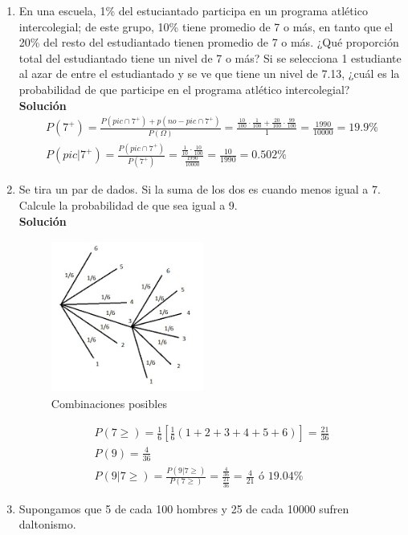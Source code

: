 \begin{enumerate}
    \item En una escuela, 1\% del estuciantado participa en un programa atlético intercolegial; de este grupo, 10\% tiene promedio de 7 o más, en tanto que el 20\% del resto del estudiantado tienen promedio de 7 o más. ¿Qué proporción total del estudiantado tiene un nivel de 7 o más? Si se selecciona 1 estudiante al azar de entre el estudiantado y se ve que tiene un nivel de 7.13, ¿cuál es la probabilidad de que participe en el programa atlético intercolegial?
    \\\textbf{Solución}
    \begin{gather*}
    P(7^+) = \frac{P(pic \cap 7^+) + p(no-pic \cap 7^+)}{P(\Omega)} = \frac{\frac{10}{100} \cdot \frac{1}{100} + \frac{20}{100} \cdot \frac{99}{100}}{1} = \frac{1990}{10000} = 19.9\% \\
    P(pic | 7^+) = \frac{P(pic \cap 7^+)}{P(7^+)} = \frac{\frac{1}{10} \cdot \frac{10}{100}}{\frac{1990}{10000}} = \frac{10}{1990} = 0.502\%
    \end{gather*}
    \item Se tira un par de dados. Si la suma de los dos es cuando menos igual a 7. Calcule la probabilidad de que sea igual a 9.
    \\\textbf{Solución}
    \begin{figure}[H]
        \begin{center}
            \includegraphics[width=5cm, height=5cm]{problema15}
            \caption{Combinaciones posibles}
        \end{center}
    \end{figure}
    \begin{gather*}
    P(7\geq) = \frac{1}{6}[\frac{1}{6}(1+2+3+4+5+6)]=\frac{21}{36}\\
    P(9) = \frac{4}{36}\\
    P(9|7\geq) = \frac{P(9|7\geq)}{P(7\geq)} = \frac{\frac{4}{36}}{\frac{21}{36}} = \frac{4}{21}\text{ ó } 19.04\%
    \end{gather*}
    \item Supongamos que 5 de cada 100 hombres y 25 de cada 10000 sufren daltonismo.\\

\end{enumerate}
